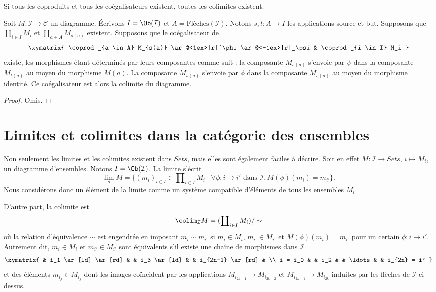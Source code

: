 \begin{lemma}
\label{lemma-colimits-coproducts-coequalizers}
\begin{slogan}
Si tous les coproduits et tous les coégalisateurs existent, toutes les
colimites existent.
\end{slogan}
Soit $M : \mathcal{I} \to \mathcal{C}$ un diagramme.
Écrivons $I = \Ob(\mathcal{I})$ et $A = \text{Flèches}(\mathcal{I})$.
Notons $s, t : A \to I$ les applications source et but.
Supposons que $\coprod_{i \in I} M_i$ et
$\coprod_{a \in A} M_{s(a)}$ existent. Supposons que le coégalisateur de
$$
\xymatrix{
\coprod_{a \in A} M_{s(a)}
\ar@<1ex>[r]^\phi \ar@<-1ex>[r]_\psi
&
\coprod_{i \in I} M_i
}
$$
existe, les morphismes étant déterminés par leurs composantes
comme suit : la composante $M_{s(a)}$ s'envoie par $\psi$
dans la composante $M_{t(a)}$ au moyen du morphisme $M(a)$.
La composante $M_{s(a)}$ s'envoie par $\phi$ dans la composante
$M_{s(a)}$ au moyen du morphisme identité. Ce coégalisateur est alors la
colimite du diagramme.
\end{lemma}

\begin{proof}
Omis.
\end{proof}








\section{Limites et colimites dans la catégorie des ensembles}
\label{section-limit-sets}

\noindent
Non seulement les limites et les colimites existent dans $\textit{Sets}$,
mais elles sont également faciles à décrire. Soit en effet
$M : \mathcal{I}
\to \textit{Sets}$, $i \mapsto M_i$, un diagramme
d'ensembles. Notons $I = \Ob(\mathcal{I})$.
La limite s'écrit
$$
\lim_\mathcal{I} M
=
\{
(m_i)_{i\in I} \in \prod\nolimits_{i\in I} M_i
\mid
\forall \phi : i \to i' \text{ dans }\mathcal{I},
M(\phi)(m_i) = m_{i'}
\}.
$$
Nous considérons donc un élément de la limite comme un système compatible
d'éléments de tous les ensembles $M_i$.

\medskip\noindent
D'autre part, la colimite est
$$
\colim_\mathcal{I} M
=
(\coprod\nolimits_{i\in I} M_i)/\sim
$$
où la relation d'équivalence $\sim$ est engendrée en imposant
$m_i \sim m_{i'}$ si $m_i \in M_i$,
$m_{i'} \in M_{i'}$ et $M(\phi)(m_i) = m_{i'}$ pour un certain
$\phi : i \to i'$. Autrement dit, $m_i \in M_i$
et $m_{i'} \in M_{i'}$ sont équivalents s'il existe une
chaîne de morphismes dans $\mathcal{I}$
$$
\xymatrix{
&
i_1 \ar[ld] \ar[rd] & &
i_3 \ar[ld] & &
i_{2n-1} \ar[rd] & \\
i = i_0 & &
i_2 & &
\ldots & &
i_{2n} = i'
}
$$
et des éléments $m_{i_j} \in M_{i_j}$ dont les images coïncident par
les applications $M_{i_{2k-1}} \to M_{i_{2k-2}}$ et
$M_{i_{2k-1}}
\to M_{i_{2k}}$ induites par les flèches de
$\mathcal{I}$ ci-dessus.


